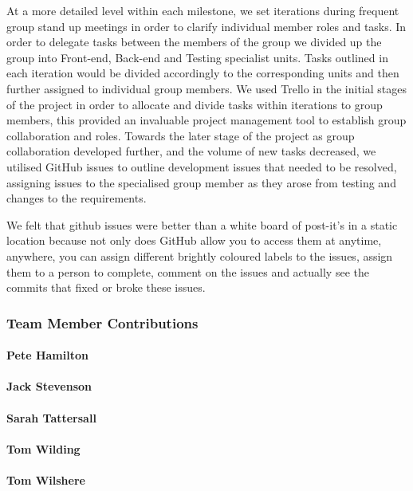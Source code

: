     At a more detailed level within each milestone, we set iterations during frequent group stand up meetings in order to clarify individual member roles and tasks. In order to delegate tasks between the members of the group we divided up the group into Front-end, Back-end and Testing specialist units. Tasks outlined in each iteration would be divided accordingly to the corresponding units and then further assigned to individual group members. We used Trello in the initial stages of the project in order to allocate and divide tasks within iterations to group members, this provided an invaluable project management tool to establish group collaboration and roles. Towards the later stage of the project as group collaboration developed further, and the volume of new tasks decreased, we utilised GitHub issues to outline development issues that needed to be resolved, assigning issues to the specialised group member as they arose from testing and changes to the requirements.

    We felt that github issues were better than a white board of post-it's in a static location because not only does GitHub allow you to access them at anytime, anywhere, you can assign different brightly coloured labels to the issues, assign them to a person to complete, comment on the issues and actually see the commits that fixed or broke these issues.

  \subsubsection {Team Member Contributions}
    \paragraph{Pete Hamilton}
    \paragraph{Jack Stevenson}
    \paragraph{Sarah Tattersall}
    \paragraph{Tom Wilding}
    \paragraph{Tom Wilshere}
